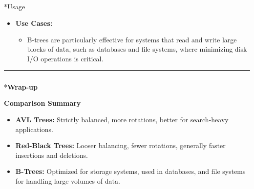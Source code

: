 \documentclass[
  letterpaper,
  DIV=11,
  numbers=noendperiod]{scrreprt}
\makeatletter
\let\oldsubparagraph\subparagraph
\renewcommand{\subparagraph}{
    \@ifstar
      \xxxSubParagraphStar
      \xxxSubParagraphNoStar
  }
\newcommand{\xxxSubParagraphStar}[1]{\oldsubparagraph*{#1}\mbox{}}
\newcommand{\xxxSubParagraphNoStar}[1]{\oldsubparagraph{#1}\mbox{}}
\providecommand{\tightlist}{%
  \setlength{\itemsep}{0pt}\setlength{\parskip}{0pt}}
\makeatother
\begin{document}
\begin{tcolorbox}[enhanced jigsaw, colframe=quarto-callout-note-color-frame, toprule=.15mm, bottomrule=.15mm, rightrule=.15mm, colback=white, breakable, arc=.35mm, opacityback=0, left=2mm, leftrule=.75mm]
\subparagraph*{Usage}\label{usage-26}

\begin{itemize}
\item
  \textbf{Use Cases:}

  \begin{itemize}
  \tightlist
  \item
    B-trees are particularly effective for systems that read and write
    large blocks of data, such as databases and file systems, where
    minimizing disk I/O operations is critical.
  \end{itemize}
\end{itemize}

\end{tcolorbox}

\begin{center}\rule{0.5\linewidth}{0.5pt}\end{center}

\subparagraph*{\texorpdfstring{\textbf{Wrap-up}}{Wrap-up}}\label{wrap-up}

\begin{tcolorbox}[enhanced jigsaw, colframe=quarto-callout-note-color-frame, toprule=.15mm, bottomrule=.15mm, rightrule=.15mm, colback=white, breakable, arc=.35mm, opacityback=0, left=2mm, leftrule=.75mm]

\vspace{-3mm}\textbf{Comparison Summary}\vspace{3mm}

\begin{itemize}
\tightlist
\item
  \textbf{AVL Trees:} Strictly balanced, more rotations, better for
  search-heavy applications.
\item
  \textbf{Red-Black Trees:} Looser balancing, fewer rotations, generally
  faster insertions and deletions.
\item
  \textbf{B-Trees:} Optimized for storage systems, used in databases,
  and file systems for handling large volumes of data.
\end{itemize}

\end{tcolorbox}
\end{document}
